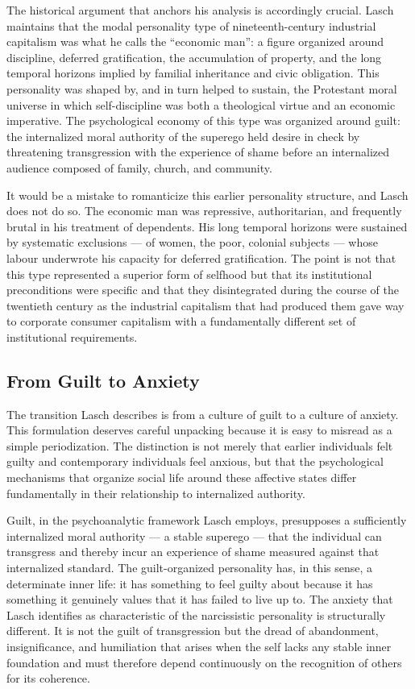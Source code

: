 \documentclass[12pt]{memoir}
\begin{document}
The historical argument that anchors his analysis is accordingly crucial. Lasch maintains that
the modal personality type of nineteenth-century industrial capitalism was what he calls the
\enquote{economic man}: a figure organized around discipline, deferred gratification, the
accumulation of property, and the long temporal horizons implied by familial inheritance and
civic obligation. This personality was shaped by, and in turn helped to sustain, the Protestant
moral universe in which self-discipline was both a theological virtue and an economic
imperative. The psychological economy of this type was organized around guilt: the internalized
moral authority of the superego held desire in check by threatening transgression with the
experience of shame before an internalized audience composed of family, church, and community.

It would be a mistake to romanticize this earlier personality structure, and Lasch does not do
so. The economic man was repressive, authoritarian, and frequently brutal in his treatment of
dependents. His long temporal horizons were sustained by systematic exclusions — of women, the
poor, colonial subjects — whose labour underwrote his capacity for deferred gratification. The
point is not that this type represented a superior form of selfhood but that its institutional
preconditions were specific and that they disintegrated during the course of the twentieth
century as the industrial capitalism that had produced them gave way to corporate consumer
capitalism with a fundamentally different set of institutional requirements.

\subsection{From Guilt to Anxiety}

The transition Lasch describes is from a culture of guilt to a culture of anxiety. This
formulation deserves careful unpacking because it is easy to misread as a simple periodization.
The distinction is not merely that earlier individuals felt guilty and contemporary individuals
feel anxious, but that the psychological mechanisms that organize social life around these
affective states differ fundamentally in their relationship to internalized authority.

Guilt, in the psychoanalytic framework Lasch employs, presupposes a sufficiently internalized
moral authority — a stable superego — that the individual can transgress and thereby incur an
experience of shame measured against that internalized standard. The guilt-organized personality
has, in this sense, a determinate inner life: it has something to feel guilty about because it
has something it genuinely values that it has failed to live up to. The anxiety that Lasch
identifies as characteristic of the narcissistic personality is structurally different. It is
not the guilt of transgression but the dread of abandonment, insignificance, and humiliation
that arises when the self lacks any stable inner foundation and must therefore depend
continuously on the recognition of others for its coherence.
\end{document}
